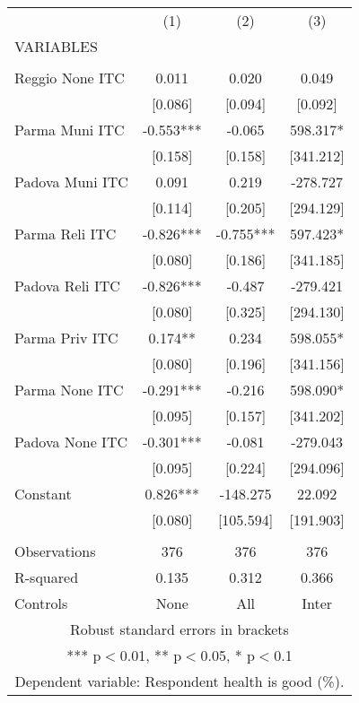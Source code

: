 \begin{tabular}{lccc} \hline
 & (1) & (2) & (3) \\
VARIABLES &  &  &  \\ \hline
 &  &  &  \\
Reggio None ITC & 0.011 & 0.020 & 0.049 \\
 & [0.086] & [0.094] & [0.092] \\
Parma Muni ITC & -0.553*** & -0.065 & 598.317* \\
 & [0.158] & [0.158] & [341.212] \\
Padova Muni ITC & 0.091 & 0.219 & -278.727 \\
 & [0.114] & [0.205] & [294.129] \\
Parma Reli ITC & -0.826*** & -0.755*** & 597.423* \\
 & [0.080] & [0.186] & [341.185] \\
Padova Reli ITC & -0.826*** & -0.487 & -279.421 \\
 & [0.080] & [0.325] & [294.130] \\
Parma Priv ITC & 0.174** & 0.234 & 598.055* \\
 & [0.080] & [0.196] & [341.156] \\
Parma None ITC & -0.291*** & -0.216 & 598.090* \\
 & [0.095] & [0.157] & [341.202] \\
Padova None ITC & -0.301*** & -0.081 & -279.043 \\
 & [0.095] & [0.224] & [294.096] \\
Constant & 0.826*** & -148.275 & 22.092 \\
 & [0.080] & [105.594] & [191.903] \\
 &  &  &  \\
Observations & 376 & 376 & 376 \\
R-squared & 0.135 & 0.312 & 0.366 \\
 Controls & None & All & Inter \\ \hline
\multicolumn{4}{c}{ Robust standard errors in brackets} \\
\multicolumn{4}{c}{ *** p$<$0.01, ** p$<$0.05, * p$<$0.1} \\
\multicolumn{4}{c}{ Dependent variable: Respondent health is good (\%).} \\
\end{tabular}
